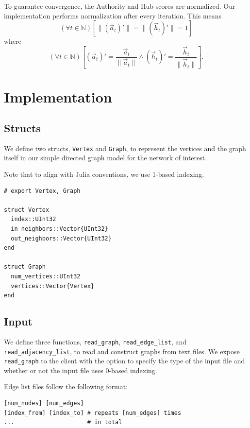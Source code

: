 \documentclass[12pt, titlepage, twoside]{amsart}
\newcommand{\N}{\ensuremath{\mathbb N}}
\begin{document}
To guarantee convergence, the Authority and Hub scores are normalized.
Our implementation performs normalization after every iteration.
This means
\[
  (\forall t\in\N)
  \left[
    \lVert(\vec{a}_t)'\rVert = \lVert(\vec{h}_t)'\rVert = 1
  \right]
\]
where
\[
  (\forall t\in\N)
  \left[
    (\vec{a}_t)' = \frac{\vec{a}_t}{\lVert\vec{a}_t\rVert}
    \wedge
    (\vec{h}_t)' = \frac{\vec{h}_t}{\lVert\vec{h}_t\rVert}
  \right].
\]

\section{Implementation}

\subsection{Structs}

We define two structs, \texttt{Vertex} and \texttt{Graph}, to represent
the vertices and the graph itself in our simple directed graph model for the network of interest.

Note that to align with Julia conventions, we use 1-based indexing.

\begin{verbatim}
# export Vertex, Graph

struct Vertex
  index::UInt32
  in_neighbors::Vector{UInt32}
  out_neighbors::Vector{UInt32}
end

struct Graph
  num_vertices::UInt32
  vertices::Vector{Vertex}
end
\end{verbatim}

\subsection{Input}

We define three functions,
\texttt{read_graph}, \texttt{read_edge_list}, and \texttt{read_adjacency_list},
to read and construct graphs from text files.
We expose \texttt{read_graph} to the client with the option to specify the type of the input file and
whether or not the input file uses 0-based indexing.

Edge list files follow the following format:

\begin{verbatim}
[num_nodes] [num_edges]
[index_from] [index_to] # repeats [num_edges] times
...                     # in total
\end{verbatim}
\end{document}
